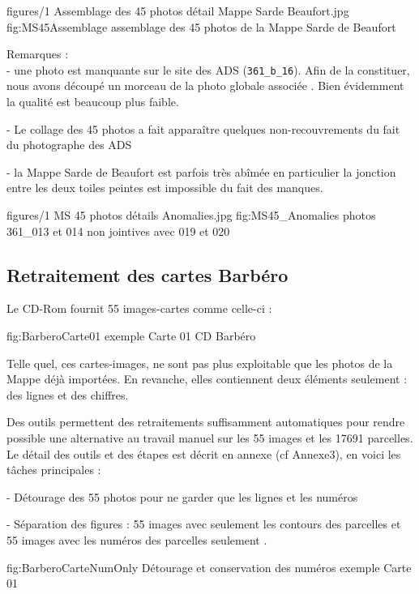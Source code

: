 \cartefigure
{figures/1 Assemblage des 45 photos détail Mappe Sarde Beaufort.jpg}
{fig:MS45Assemblage}
{assemblage des 45 photos de la Mappe Sarde de Beaufort}

Remarques :\\
- une photo est manquante sur le site des ADS (\texttt{361\_b\_16}). Afin de la constituer, nous avons découpé un morceau de  la photo globale associée . Bien évidemment la qualité est beaucoup plus faible.

- Le collage des 45 photos a fait apparaître quelques non-recouvrements du fait du photographe des ADS

- la Mappe Sarde de Beaufort est parfois très abîmée en particulier la jonction entre les deux toiles peintes est impossible du fait des manques.

\cartefigure
{figures/1 MS 45 photos détails Anomalies.jpg}
{fig:MS45_Anomalies}
{photos 361_013 et 014 non jointives avec 019 et 020}






\subsection{Retraitement des cartes Barbéro}

Le CD-Rom fournit 55 images-cartes comme celle-ci :

{fig:BarberoCarte01}
{exemple Carte 01 CD Barbéro} 

Telle quel, ces cartes-images, ne sont pas plus exploitable que les photos de la Mappe déjà importées.
En revanche, elles contiennent deux éléments seulement : des lignes et des chiffres.

Des outils permettent des retraitements suffisamment automatiques pour rendre possible une alternative au travail manuel sur les 55 images et les 17691 parcelles. Le détail des outils et des étapes est décrit en annexe (cf Annexe3), en voici les tâches principales :

-	Détourage des 55 photos pour ne garder que les lignes et les numéros

-	Séparation des figures : 55 images avec seulement les contours des parcelles et 55 images avec les numéros des parcelles seulement .

{fig:BarberoCarteNumOnly}
{Détourage et conservation des numéros exemple Carte 01}


